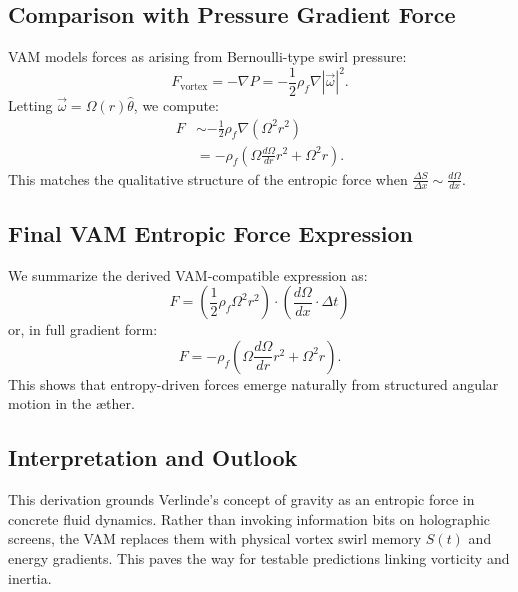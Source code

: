 \documentclass[preprint]{revtex4-2}
\begin{document}
            \subsection*{Comparison with Pressure Gradient Force}
            VAM models forces as arising from Bernoulli-type swirl pressure:
            \begin{equation}
                F_\text{vortex} = -\nabla P = -\frac{1}{2} \rho_{\scriptscriptstyle\boldsymbol\!f} \nabla |\vec{\omega}|^2.
            \end{equation}
            Letting $\vec{\omega} = \Omega(r) \hat{\theta}$, we compute:
            \begin{align}
                F &\sim -\frac{1}{2} \rho_{\scriptscriptstyle\boldsymbol\!f} \nabla (\Omega^2 r^2) \\
                  &= -\rho_{\scriptscriptstyle\boldsymbol\!f} \left( \Omega \frac{d\Omega}{dr} r^2 + \Omega^2 r \right).
            \end{align}
            This matches the qualitative structure of the entropic force when $\frac{\Delta S}{\Delta x} \sim \frac{d\Omega}{dx}$.

            \subsection{Final VAM Entropic Force Expression}
            We summarize the derived VAM-compatible expression as:
            \begin{equation}
                F = \left( \frac{1}{2} \rho_{\scriptscriptstyle\boldsymbol\!f} \Omega^2 r^2 \right) \cdot \left( \frac{d\Omega}{dx} \cdot \Delta t \right)
            \end{equation}
            or, in full gradient form:
            \begin{equation}
                F = -\rho_{\scriptscriptstyle\boldsymbol\!f} \left( \Omega \frac{d\Omega}{dr} r^2 + \Omega^2 r \right).
            \end{equation}
            This shows that entropy-driven forces emerge naturally from structured angular motion in the æther.

            \subsection*{Interpretation and Outlook}
            This derivation grounds Verlinde's concept of gravity as an entropic force in concrete fluid dynamics. Rather than invoking information bits on holographic screens, the VAM replaces them with physical vortex swirl memory $S(t)$ and energy gradients. This paves the way for testable predictions linking vorticity and inertia.
\end{document}
